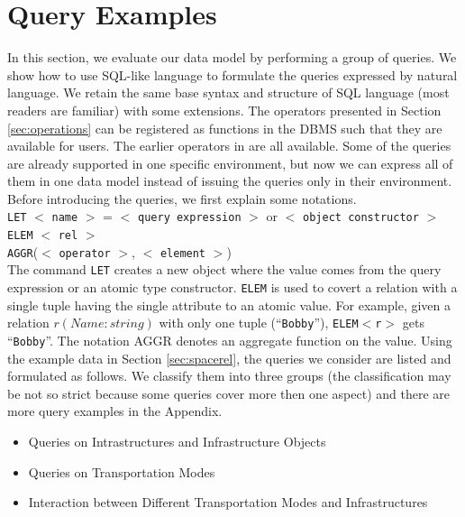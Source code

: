 \section{Query Examples}
\label{sec:exampledataandquery}
In this section, we evaluate our data model by performing a group of queries. We show 
how to use SQL-like language to formulate the queries 
expressed by natural language. We retain the same base syntax 
and structure of SQL language (most readers are familiar) with some extensions. 
The operators presented in Section \ref{sec:operations} can be registered as functions in the DBMS 
such that they are available for users. The earlier operators in \cite{GBE+00,GA2006} are all available.  Some of the queries are already supported in one specific
environment, but now we can express all of them in one data model instead of issuing the queries only in their environment. Before introducing the queries, we first explain some notations. \\

\texttt{LET} $<$ \texttt{name} $>$ = $<$ \texttt{query expression} $>$ or $<$ \texttt{object constructor} $>$\\

\texttt{ELEM} $<$ \texttt{rel} $>$ \\

\texttt{AGGR}($<$ \texttt{operator} $>$, $<$ \texttt{element} $>$) \\

The command \texttt{LET} creates a new object where the value comes from the query expression or an atomic type constructor. \texttt{ELEM} is used to covert a relation with a single tuple having the single attribute to an atomic value. For example, given a relation $r(Name:string)$ with only one tuple (``\texttt{Bobby}''), \texttt{ELEM$<$r$>$} gets ``\texttt{Bobby}''. 
The notation AGGR denotes an aggregate function on the value. 
Using the example data in Section \ref{sec:spacerel}, 
the queries we consider are listed and formulated as follows. We classify them into three groups (the classification may be not so strict because some queries cover more then one aspect) and there are more query examples in the Appendix. \\

\begin{itemize}
 \item Queries on Intrastructures and Infrastructure Objects
 \item Queries on Transportation Modes
 \item Interaction between Different Transportation Modes and Infrastructures \\
\end{itemize}



